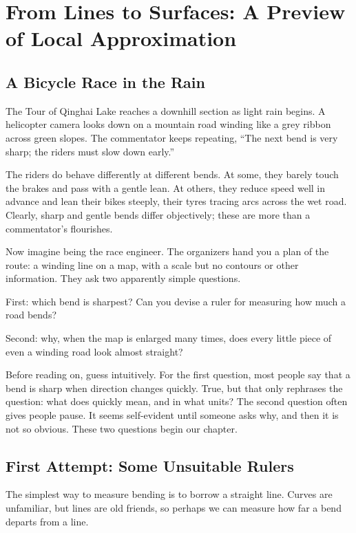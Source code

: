 \chapter{From Lines to Surfaces: A Preview of Local Approximation}

\section{A Bicycle Race in the Rain}

The Tour of Qinghai Lake reaches a downhill section as light rain begins. A helicopter camera looks down on a mountain road winding like a grey ribbon across green slopes. The commentator keeps repeating, ``The next bend is very sharp; the riders must slow down early.''

The riders do behave differently at different bends. At some, they barely touch the brakes and pass with a gentle lean. At others, they reduce speed well in advance and lean their bikes steeply, their tyres tracing arcs across the wet road. Clearly, sharp and gentle bends differ objectively; these are more than a commentator's flourishes.

Now imagine being the race engineer. The organizers hand you a plan of the route: a winding line on a map, with a scale but no contours or other information. They ask two apparently simple questions.

First: which bend is sharpest? Can you devise a ruler for measuring how much a road bends?

Second: why, when the map is enlarged many times, does every little piece of even a winding road look almost straight?

Before reading on, guess intuitively. For the first question, most people say that a bend is sharp when direction changes quickly. True, but that only rephrases the question: what does quickly mean, and in what units? The second question often gives people pause. It seems self-evident until someone asks why, and then it is not so obvious. These two questions begin our chapter.

\section{First Attempt: Some Unsuitable Rulers}

The simplest way to measure bending is to borrow a straight line. Curves are unfamiliar, but lines are old friends, so perhaps we can measure how far a bend departs from a line.

